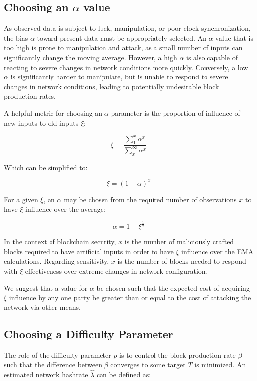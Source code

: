\documentclass[]{article}
\begin{document}
\subsection{Choosing an $\alpha$ value}

As observed data is subject to luck, manipulation, or poor clock synchronization, the bias $\alpha$ toward present data must be appropriately selected.  An $\alpha$ value that is too high is prone to manipulation and attack, as a small number of inputs can significantly change the moving average.  However, a high $\alpha$ is also capable of reacting to severe changes in network conditions more quickly.  Conversely, a low $\alpha$ is significantly harder to manipulate, but is unable to respond to severe changes in network conditions, leading to potentially undesirable block production rates.
\newline 

 A helpful metric for choosing an $\alpha$ parameter is the proportion of influence of new inputs to old inputs $\xi$:

\begin{equation}
\xi = \frac{\sum_{1}^{x} \alpha^x}{\sum_{x}^{\infty} \alpha^x}
\end{equation}

Which can be simplified to: 

\begin{equation}
	\xi = (1 - \alpha)^x
\end{equation}

For a given $\xi$, an $\alpha$ may be chosen from the required number of observations $x$ to have $\xi$ influence over the average: 

\begin{equation}
\alpha = 1 - \xi^\frac{1}{x}
\end{equation}

In the context of blockchain security, $x$ is the number of maliciously crafted blocks required to have artificial inputs in order to have $\xi$ influence over the EMA calculations.  Regarding sensitivity, $x$ is the number of blocks needed to respond with $\xi$ effectiveness over extreme changes in network configuration.  
\newline

We suggest that a value for $\alpha$ be chosen such that the expected cost of acquiring $\xi$ influence by any one party be greater than or equal to the cost of attacking the network via other means.  

\subsection{Choosing a Difficulty Parameter}
The role of the difficulty parameter $p$ is to control the block production rate $\beta$ such that the difference between $\beta$ converges to some target $T$ is minimized.  An estimated network hashrate $\hat{\lambda}$ can be defined as: 
\end{document}
